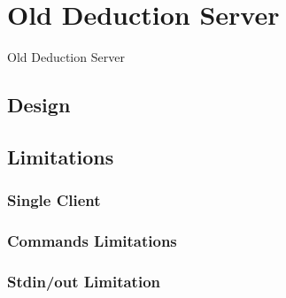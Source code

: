 \chapter{Old Deduction Server}
Old Deduction Server

  \section{Design}

  \section{Limitations}
    \subsection{Single Client}
    \subsection{Commands Limitations}
    \subsection{Stdin/out Limitation}


